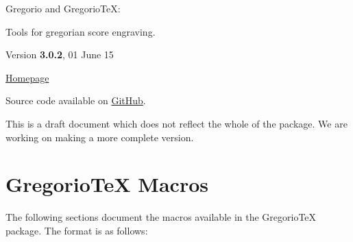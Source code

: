 \documentclass[12pt,a4paper]{article}
\begin{document}
\begin{titlepage}
  \begin{center}
    \Huge
    \textcolor{myred}{Gregorio} and \textcolor{myred}{Gregorio\TeX}:

    Tools for gregorian score engraving.

    \vspace{1cm}

    \large Version \textbf{3.0.2}, 01 June 15 %

    \vspace{1.5cm}
    \begingroup%
      \redlines
      \def\grelowchoralsignstyle#1{{\cminfamily\small\kern-0.2em#1}}
      \def\grehighchoralsignstyle#1{{\cminfamily\small\kern-0.2em#1}}
      \def\grestar{\greheightstar}
      \color{black!60}
      \setmainfont[SmallCapsFont=AlegreyaSC]{Alegreya}%
      \addtolength{\hsize}{-4cm}%
      \setlength{\fboxsep}{5mm}%
      \begin{list}{}{%
        \setlength{\topsep}{0pt}%
        \setlength{\leftmargin}{1.5cm}%
        \setlength{\rightmargin}{1.5cm}%
        \setlength{\listparindent}{0pt}%
        \setlength{\itemindent}{0pt}%
        \setlength{\parsep}{0pt}%
      }\item[]{}%
      \end{list}%
      \gresetfirstannotation{}
      \gresetsecondannotation{}
    \endgroup%

    \vspace{1.5cm}%
    \href{http://gregorio-project.github.io/}{Homepage}

    Source code available on
    \href{http://github.com/gregorio-project/gregorio}{GitHub}.
  \end{center}

  \vspace{2cm}
  This is a draft document which does not reflect the whole of the package.
  We are working on making a more complete version.
\end{titlepage}

\cleardoublepage

\tableofcontents

\cleardoublepage

\section{Gregorio\TeX{} Macros}
The following sections document the macros available in the Gregorio\TeX{} package. The format is as follows:
\end{document}
